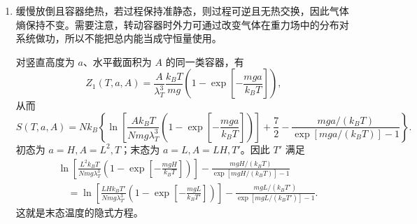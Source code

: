 \begin{question}[25 分]
\begin{solution}
\begin{enumerate}
    \item 缓慢放倒且容器绝热，若过程保持准静态，则过程可逆且无热交换，因此气体熵保持不变。需要注意，转动容器时外力可通过改变气体在重力场中的分布对系统做功，所以不能把总内能当成守恒量使用。

    对竖直高度为 $a$、水平截面积为 $A$ 的同一类容器，有
    \[
        Z_1(T,a,A)=\frac{A}{\lambda_T^3}\frac{k_BT}{mg}
        \left(1-\exp\left[-\frac{mga}{k_BT}\right]\right),
    \]
    从而
    \[
        S(T,a,A)=Nk_B\left\{
        \ln\left[\frac{Ak_BT}{Nmg\lambda_T^3}
        \left(1-\exp\left[-\frac{mga}{k_BT}\right]\right)\right]
        +\frac{7}{2}-\frac{mga/(k_BT)}{\exp[mga/(k_BT)]-1}
        \right\}.
    \]
    初态为 $a=H,A=L^2,T$；末态为 $a=L,A=LH,T'$。因此 $T'$ 满足
    \[
    \boxed{
    \begin{aligned}
    &\ln\left[\frac{L^2k_BT}{Nmg\lambda_T^3}
    \left(1-\exp\left[-\frac{mgH}{k_BT}\right]\right)\right]
    -\frac{mgH/(k_BT)}{\exp[mgH/(k_BT)]-1} \\
    &\quad =
    \ln\left[\frac{LHk_BT'}{Nmg\lambda_{T'}^3}
    \left(1-\exp\left[-\frac{mgL}{k_BT'}\right]\right)\right]
    -\frac{mgL/(k_BT')}{\exp[mgL/(k_BT')]-1}.
    \end{aligned}}
    \]
    这就是末态温度的隐式方程。
\end{enumerate}
\end{solution}
\end{question}

